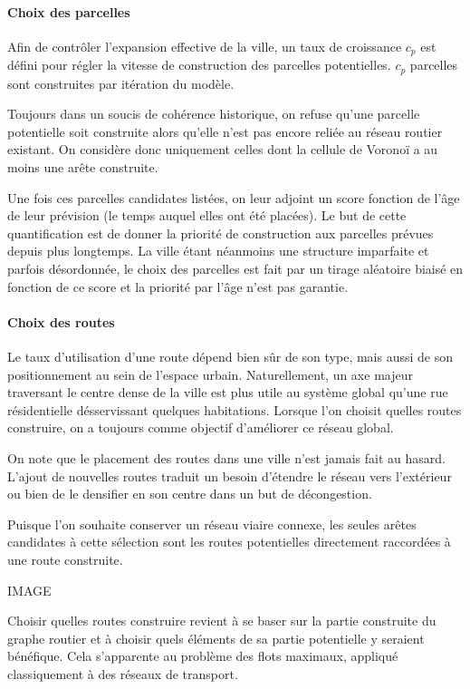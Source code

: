 \documentclass[12pt]{article}
\begin{document}
\paragraph{Choix des parcelles\\}

Afin de contrôler l'expansion effective de la ville, un taux de
croissance $c_p$ est défini pour régler la vitesse de construction des
parcelles potentielles. $c_p$ parcelles sont construites par itération
du modèle.

Toujours dans un soucis de cohérence historique, on refuse qu'une
parcelle potentielle soit construite alors qu'elle n'est pas encore
reliée au réseau routier existant. On considère donc uniquement celles
dont la cellule de Voronoï a au moins une arête construite.

Une fois ces parcelles candidates listées, on leur adjoint un score
fonction de l'âge de leur prévision (le temps auquel elles ont été
placées). Le but de cette quantification est de donner la priorité de
construction aux parcelles prévues depuis plus longtemps. La ville
étant néanmoins une structure imparfaite et parfois désordonnée, le
choix des parcelles est fait par un tirage aléatoire biaisé en
fonction de ce score et la priorité par l'âge n'est pas garantie.

\paragraph{Choix des routes\\}

Le taux d'utilisation d'une route dépend bien sûr de son type, mais
aussi de son positionnement au sein de l'espace urbain. Naturellement,
un axe majeur traversant le centre dense de la ville est plus utile au
système global qu'une rue résidentielle désservissant quelques
habitations. Lorsque l'on choisit quelles routes construire, on a
toujours comme objectif d'améliorer ce réseau global.

On note que le placement des routes dans une ville n'est jamais fait
au hasard. L'ajout de nouvelles routes traduit un besoin d'étendre le
réseau vers l'extérieur ou bien de le densifier en son centre dans un
but de décongestion.

Puisque l'on souhaite conserver un réseau viaire connexe, les seules
arêtes candidates à cette sélection sont les routes potentielles
directement raccordées à une route construite.

IMAGE

Choisir quelles routes construire revient à se baser sur la partie
construite du graphe routier et à choisir quels éléments de sa partie
potentielle y seraient bénéfique. Cela s'apparente au problème des
flots maximaux, appliqué classiquement à des réseaux de transport.
\end{document}
